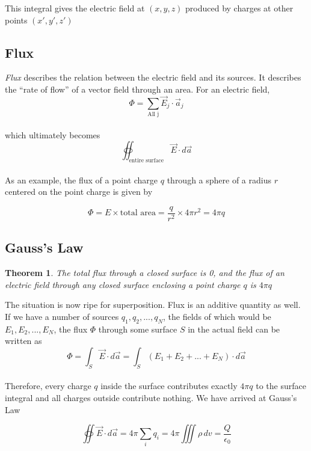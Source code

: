 \documentclass[svgnames]{article}
\newtheorem{theorem}{Theorem}		        %
\begin{document}
This integral gives the electric field at $(x,y,z)$ produced by charges at other points $(x',y',z')$

\subsection{Flux}
  

\textit{Flux} describes the relation between the electric field and its
sources. It describes the ``rate of flow'' of a vector field through an area. For an electric field, \\

\[ \Phi = \sum_{\text{All j}} \vec{E}_j \cdot \vec{a}_j \] \\

which ultimately becomes \\ 

\[ \oiint_\text{entire surface} \vec{E} \cdot d\vec{a} \] \\ 

As an example, the flux of a point charge $q$ through a sphere of a radius $r$
centered on the point charge is given by

\[ \Phi = E \times \text{total area} = \frac{q}{r^2} \times 4\pi r^2 = 4\pi q \] 

\subsection{Gauss's Law} 

\begin{theorem}
The total flux through a closed surface is 0, and the flux of an electric field
through \textit{any} closed surface enclosing a point charge $q$ is $4\pi q$ 
\end{theorem} 

The situation is now ripe for superposition. Flux is an additive quantity as
well. If we have a number of sources $q_1,q_2,...,q_N$, the fields of which
would be $E_1,E_2,...,E_N$, the flux $\Phi$ through some surface $S$ in the actual field can be written as \\

\[ \Phi = \int_S \vec{E} \cdot d\vec{a} = \int_S (E_1 + E_2 + ... + E_N) \cdot d\vec{a} \] \\

Therefore, every charge $q$ inside the surface contributes exactly $4\pi q$ to
the surface integral and all charges outside contribute nothing. We have arrived at Gauss's Law \\ 
\begin{tcolorbox}[colback = blue!5!white, colframe = blue!50!black, title
  = Gauss's Law]
\[ \oiint \vec{E} \cdot d\vec{a} = 4\pi
\sum_i q_i = 4\pi \iiint \rho \, dv =  \frac{Q}{\epsilon_0} \]  
\end{tcolorbox}
\end{document}
